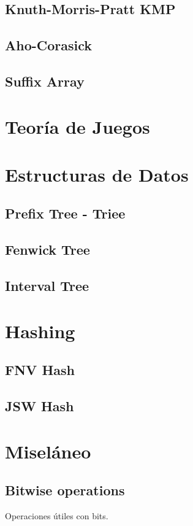 \documentclass[10pt,letterpaper,twocolumn,twosided]{article}
\newcommand{\codigofuente}[1]{

\dotfill
}
\begin{document}
\subsection{Knuth-Morris-Pratt KMP}

\subsection{Aho-Corasick}

\subsection{Suffix Array}

\section{Teoría de Juegos}

\section{Estructuras de Datos}

\subsection{Prefix Tree - Triee}

\subsection{Fenwick Tree}

\subsection{Interval Tree}

\section{Hashing} %

\subsection{FNV Hash}

\subsection{JSW Hash}

\section{Miseláneo}

\subsection {Bitwise operations}
Operaciones útiles con bits.

\codigofuente{../src/bitwise.${EXT}}
\end{document}
